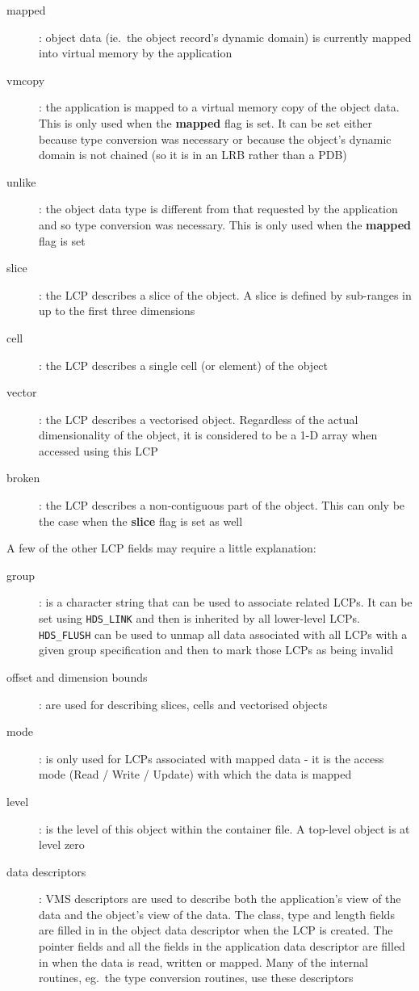 \begin {description}
\item [mapped]: object data (ie.\ the object record's dynamic domain) is
currently mapped into virtual memory by the application
\item [vmcopy]: the application is mapped to a virtual memory copy of the
object data. This is only used when the {\bf mapped} flag is set. It can
be set either because type conversion was necessary or because the object's
dynamic domain is not chained (so it is in an LRB rather than a PDB)
\item [unlike]: the object data type is different from that requested by
the application and so type conversion was necessary. This is only used when
the {\bf mapped} flag is set
\item [slice]: the LCP describes a slice of the object. A slice is defined by
sub-ranges in up to the first three dimensions
\item [cell]: the LCP describes a single cell (or element) of the object
\item [vector]: the LCP describes a vectorised object. Regardless of the
actual dimensionality of the object, it is considered to be a 1-D array when
accessed using this LCP
\item [broken]: the LCP describes a non-contiguous part of the object. This
can only be the case when the {\bf slice} flag is set as well
\end {description}

A few of the other LCP fields may require a little explanation:

\begin {description}
\item [group]: is a character string that can be used to associate related
LCPs. It can be set using {\tt HDS\_LINK} and then is inherited by all
lower-level LCPs. {\tt HDS\_FLUSH} can be used to unmap all data associated
with all LCPs with a given group specification and then to mark those LCPs
as being invalid
\item [offset and dimension bounds]: are used for describing slices, cells
and vectorised objects
\item [mode]: is only used for LCPs associated with mapped data - it is
the access mode (Read / Write / Update) with which the data is mapped
\item [level]: is the level of this object within the container file. A
top-level object is at level zero
\item [data descriptors]: VMS descriptors are used to describe both the
application's view of the data and the object's view of the data. The class,
type and length fields are filled in in the object data descriptor when
the LCP is created. The pointer fields and all the fields in the application
data descriptor are filled in when the data is read, written or mapped.
Many of the internal routines, eg.\ the type conversion routines, use these
descriptors
\end {description}

